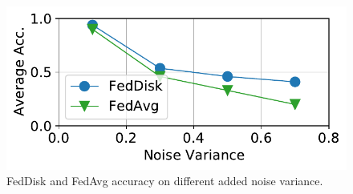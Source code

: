 \documentclass[mathfont=newtx]{uai2023} %
\begin{document}
\begin{figure}[ht!]
	\centering
	\includegraphics[width=0.8\linewidth]{Figures/Accuracy_vs_noise}
	\caption{FedDisk and FedAvg accuracy on different added noise variance.}	
	\label{fig:accvsnoise}
\end{figure}
\end{document}
